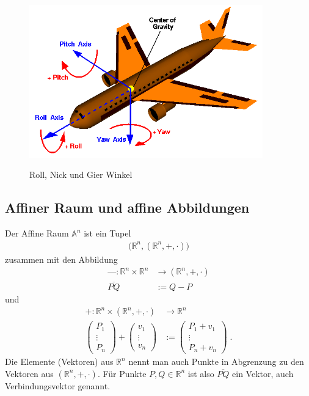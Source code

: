 \begin{figure}[H]
    \centering
    \includegraphics[width=0.9\textwidth]{images/pitch.png}
    \label{fig:roll-pitch-yaw}
    \caption{Roll, Nick und Gier Winkel}
\end{figure}

\subsection{Affiner Raum und affine Abbildungen}
Der Affine Raum $\mathbb{A}^n$ ist ein Tupel
\begin{align*}
\bigl( \mathbb{R}^n, (\mathbb{R}^n, + , \cdot ) \bigr )
\end{align*}
zusammen mit den Abbildung 
\begin{align*}
\text{---} : \mathbb{R}^n \times \mathbb{R}^n  & \to (\mathbb{R}^n, + , \cdot ) \\
\overline{PQ} & := Q-P  
\end{align*}
und
\begin{align*}
+ : \mathbb{R}^n \times (\mathbb{R}^n, + , \cdot )   & \to  \mathbb{R}^n\\
\begin{pmatrix}
P_1 \\ \vdots \\ P_n
\end{pmatrix} + \begin{pmatrix}
v_1 \\ \vdots \\ v_n
\end{pmatrix} & := \begin{pmatrix}
P_1  + v_1 \\ \vdots \\ P_n + v_n 
\end{pmatrix}   \;.
\end{align*}
Die Elemente (Vektoren) aus $\mathbb{R}^n$ nennt man auch  Punkte in Abgrenzung zu den Vektoren aus $(\mathbb{R}^n, + , \cdot )$.  
Für Punkte $P,Q \in \mathbb{R}^n$ ist also $\overline{PQ}$ ein Vektor, auch Verbindungsvektor genannt.

